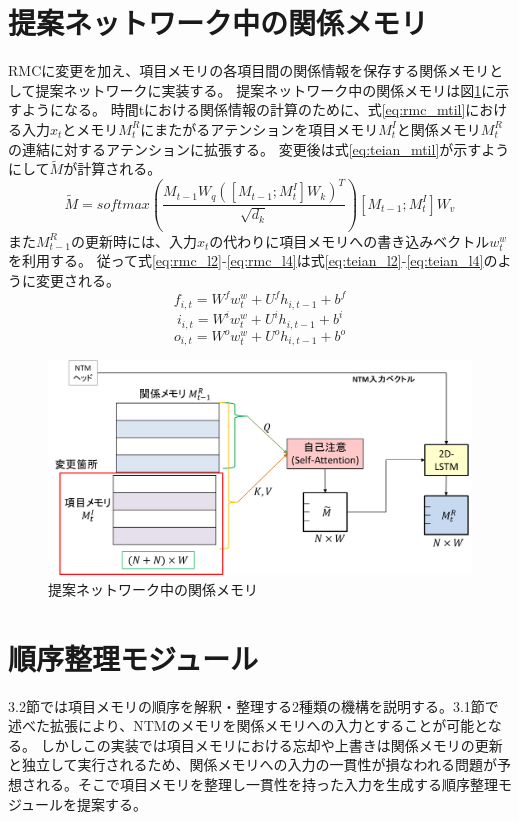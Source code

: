 \section{提案ネットワーク中の関係メモリ}
RMCに変更を加え、項目メモリの各項目間の関係情報を保存する関係メモリとして提案ネットワークに実装する。
提案ネットワーク中の関係メモリは図\ref{fig:teian_rmc}に示すようになる。
時間tにおける関係情報の計算のために、式\ref{eq:rmc_mtil}における入力$x_t$とメモリ$M^R_t$にまたがるアテンションを項目メモリ$M^I_t$と関係メモリ$M^R_t$の連結に対するアテンションに拡張する。
変更後は式\ref{eq:teian_mtil}が示すようにして$\tilde{M}$が計算される。
\begin{equation} \label{eq:teian_mtil}
	\tilde{M} =softmax ( \frac{M_{t-1}W_q ([M_{t-1};M^I_t]W_k)^T}{ \sqrt{d_k}} ) [M_{t-1};M^I_t]W_v
\end{equation}
また$M^R_{t-1}$の更新時には、入力$x_t$の代わりに項目メモリへの書き込みベクトル$w^w_t$を利用する。
従って式\ref{eq:rmc_l2}-\ref{eq:rmc_l4}は式\ref{eq:teian_l2}-\ref{eq:teian_l4}のように変更される。
\begin{equation}\label{eq:teian_l2}
	f_{i,t}=W^f w^w_t +U^f h_{i,t-1}+b^f
\end{equation}
\begin{equation}\label{eq:teian_l3}
	i_{i,t}=W^i w^w_t +U^i h_{i,t-1}+b^i
\end{equation}
\begin{equation}\label{eq:teian_l4}
	o_{i,t}=W^o w^w_t +U^o h_{i,t-1}+b^o 
\end{equation}

\begin{figure}[t]
	\centering
	\includegraphics[width=\linewidth]{./figure/img_slide/teian_rmc.png}
	\caption{提案ネットワーク中の関係メモリ}
	\label{fig:teian_rmc}
\end{figure}

\section{順序整理モジュール}
3.2節では項目メモリの順序を解釈・整理する2種類の機構を説明する。3.1節で述べた拡張により、NTMのメモリを関係メモリへの入力とすることが可能となる。
しかしこの実装では項目メモリにおける忘却や上書きは関係メモリの更新と独立して実行されるため、関係メモリへの入力の一貫性が損なわれる問題が予想される。そこで項目メモリを整理し一貫性を持った入力を生成する順序整理モジュールを提案する。

